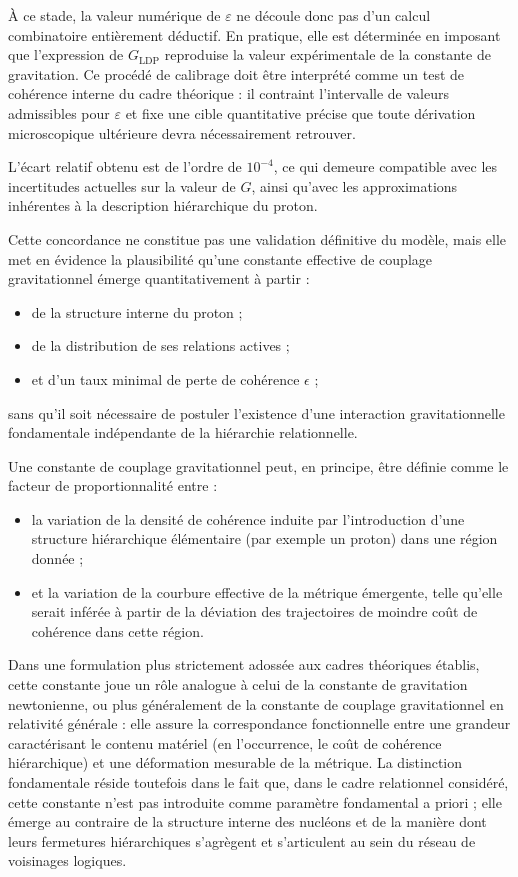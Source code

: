 \documentclass[11pt,a4paper]{article}
\begin{document}
À ce stade, la valeur numérique de \(\varepsilon\) ne découle donc pas d’un calcul combinatoire entièrement déductif. En pratique, elle est déterminée en imposant que l’expression de \(G_{\mathrm{LDP}}\) reproduise la valeur expérimentale de la constante de gravitation. Ce procédé de calibrage doit être interprété comme un test de cohérence interne du cadre théorique : il contraint l’intervalle de valeurs admissibles pour \(\varepsilon\) et fixe une cible quantitative précise que toute dérivation microscopique ultérieure devra nécessairement retrouver.

L’écart relatif obtenu est de l’ordre de \(10^{-4}\), ce qui demeure compatible avec les incertitudes actuelles sur la valeur de \(G\), ainsi qu’avec les approximations inhérentes à la description hiérarchique du proton.

Cette concordance ne constitue pas une validation définitive du modèle, mais elle met en évidence la plausibilité qu’une constante effective de couplage gravitationnel émerge quantitativement à partir :
\begin{itemize}
  \item de la structure interne du proton ; 
  \item de la distribution de ses relations actives ; 
  \item et d’un taux minimal de perte de cohérence \(\epsilon\) ; 
\end{itemize}
sans qu’il soit nécessaire de postuler l’existence d’une interaction gravitationnelle fondamentale indépendante de la hiérarchie relationnelle.

Une constante de couplage gravitationnel peut, en principe, être définie comme le facteur de proportionnalité entre : 
\begin{itemize}
  \item la variation de la densité de cohérence induite par l’introduction d’une structure hiérarchique élémentaire (par exemple un proton) dans une région donnée ;
  \item et la variation de la courbure effective de la métrique émergente, telle qu’elle serait inférée à partir de la déviation des trajectoires de moindre coût de cohérence dans cette région.
\end{itemize}

Dans une formulation plus strictement adossée aux cadres théoriques établis, cette constante joue un rôle analogue à celui de la constante de gravitation newtonienne, ou plus généralement de la constante de couplage gravitationnel en relativité générale : elle assure la correspondance fonctionnelle entre une grandeur caractérisant le contenu matériel (en l’occurrence, le coût de cohérence hiérarchique) et une déformation mesurable de la métrique. La distinction fondamentale réside toutefois dans le fait que, dans le cadre relationnel considéré, cette constante n’est pas introduite comme paramètre fondamental a priori ; elle émerge au contraire de la structure interne des nucléons et de la manière dont leurs fermetures hiérarchiques s’agrègent et s’articulent au sein du réseau de voisinages logiques.
\end{document}
